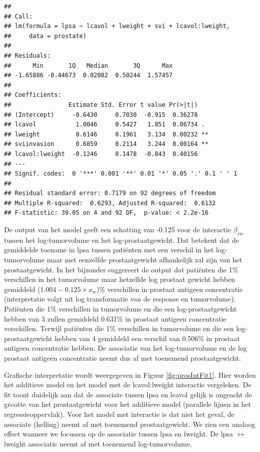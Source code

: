\documentclass[
  12pt,dutch,coursenotes]{book}
\theoremstyle{definition}
\theoremstyle{definition}
\theoremstyle{definition}
\theoremstyle{definition}
\theoremstyle{remark}
\begin{document}
\begin{lstlisting}
## 
## Call:
## lm(formula = lpsa ~ lcavol + lweight + svi + lcavol:lweight, 
##     data = prostate)
## 
## Residuals:
##      Min       1Q   Median       3Q      Max 
## -1.65886 -0.44673  0.02082  0.50244  1.57457 
## 
## Coefficients:
##                Estimate Std. Error t value Pr(>|t|)   
## (Intercept)     -0.6430     0.7030  -0.915  0.36278   
## lcavol           1.0046     0.5427   1.851  0.06734 . 
## lweight          0.6146     0.1961   3.134  0.00232 **
## sviinvasion      0.6859     0.2114   3.244  0.00164 **
## lcavol:lweight  -0.1246     0.1478  -0.843  0.40156   
## ---
## Signif. codes:  0 '***' 0.001 '**' 0.01 '*' 0.05 '.' 0.1 ' ' 1
## 
## Residual standard error: 0.7179 on 92 degrees of freedom
## Multiple R-squared:  0.6293, Adjusted R-squared:  0.6132 
## F-statistic: 39.05 on 4 and 92 DF,  p-value: < 2.2e-16
\end{lstlisting}

De output van het model geeft een schatting van -0.125 voor de interactie \(\beta_{vw}\) tussen het log-tumorvolume en het log-prostaatgewicht. Dat betekent dat de gemiddelde toename in lpsa tussen patiënten met een verschil in het log-tumorvolume maar met eenzelfde prostaatgewicht afhankelijk zal zijn van het prostaatgewicht.
In het bijzonder suggereert de output dat patiënten die 1\% verschillen in het tumorvolume maar hetzelfde log prostaat gewicht hebben gemiddeld (\(1.004-0.125 \times x_w\))\% verschillen in prostaat antigeen concentratie (interpretatie volgt uit log transformatie van de response en tumorvolume).
Patiënten die 1\% verschillen in tumorvolume en die een log-prostaatgewicht hebben van 3 zullen gemiddeld 0.631\% in prostaat antigeen concentratie verschillen. Terwijl patiënten die 1\% verschillen in tumorvolume en die een log-prostaatgewicht hebben van 4 gemiddeld een verschil van 0.506\% in prostaat antigeen concentratie hebben. De associatie van het log-tumorvolume en de log prostaat antigeen concentratie neemt dus af met toenemend prostaatgewicht.

Grafische interpretatie wordt weergegeven in Figuur \ref{fig:prosIntFit1}. Hier worden het additieve model en het model met de lcavol:lweight interactie vergeleken. De fit toont duidelijk aan dat de associate tussen lpsa en lcavol gelijk is ongeacht de grootte van het prostaatgewicht voor het additieve model (parallele lijnen in het regressieoppervlak). Voor het model met interactie is dat niet het geval, de associate (helling) neemt af met toenemend prostaatgewicht. We zien een analoog effect wanneer we focussen op de associatie tussen lpsa en lweight. De lpsa \(\leftrightarrow\) lweight associatie neemt af met toenemend log-tumorvolume.
\end{document}
